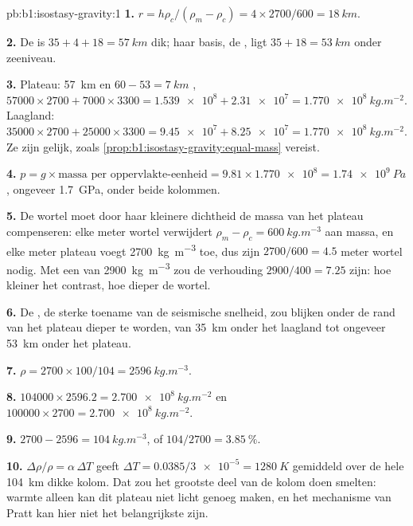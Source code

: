 \begin{solution}{pb:b1:isostasy-gravity:1}
\textbf{1.} $r = h\rho_c/(\rho_m - \rho_c) = 4\times2700/600 = \qty{18}{km}$.

\textbf{2.} De  is $35 + 4 + 18 = \qty{57}{km}$ dik; haar basis, de , ligt $35 + 18 = \qty{53}{km}$ onder zeeniveau.

\textbf{3.} Plateau: \qty{57}{km}  en $60 - 53 = \qty{7}{km}$ ,
$\num{57000}\times2700 + \num{7000}\times3300 = \num{1.539e8} + \num{2.31e7} =
\qty{1.770e8}{kg.m^{-2}}$. Laagland: $\num{35000}\times2700 + \num{25000}\times3300
= \num{9.45e7} + \num{8.25e7} = \qty{1.770e8}{kg.m^{-2}}$. Ze zijn gelijk, zoals \cref{prop:b1:isostasy-gravity:equal-mass} vereist.

\textbf{4.} $p = g\times\text{massa per oppervlakte-eenheid} = 9.81\times\num{1.770e8} =
\qty{1.74e9}{Pa}$, ongeveer \qty{1.7}{GPa}, onder beide kolommen.

\textbf{5.} De wortel moet door haar kleinere dichtheid de massa van het plateau compenseren: elke meter wortel verwijdert $\rho_m - \rho_c = \qty{600}{kg.m^{-3}}$ aan massa, en elke meter plateau voegt \qty{2700}{kg.m^{-3}} toe, dus zijn $2700/600 = 4.5$ meter wortel nodig. Met een  van \qty{2900}{kg.m^{-3}} zou de verhouding $2900/400 = 7.25$ zijn: hoe kleiner het contrast, hoe dieper de wortel.

\textbf{6.} De , de sterke toename van de seismische snelheid, zou blijken onder de rand van het plateau dieper te worden, van \qty{35}{km} onder het laagland tot ongeveer \qty{53}{km} onder het plateau.

\textbf{7.} $\rho = 2700\times100/104 = \qty{2596}{kg.m^{-3}}$.

\textbf{8.} $\num{104000}\times2596.2 = \qty{2.700e8}{kg.m^{-2}}$ en
$\num{100000}\times2700 = \qty{2.700e8}{kg.m^{-2}}$.

\textbf{9.} $2700 - 2596 = \qty{104}{kg.m^{-3}}$, of $104/2700 =
\qty{3.85}{\percent}$.

\textbf{10.} $\Delta\rho/\rho = \alpha\,\Delta T$ geeft $\Delta T =
0.0385/\num{3e-5} = \qty{1280}{K}$ gemiddeld over de hele \qty{104}{km} dikke kolom. Dat zou het grootste deel van de kolom doen smelten: warmte alleen kan dit plateau niet licht genoeg maken, en het mechanisme van Pratt kan hier niet het belangrijkste zijn.


\end{solution}
